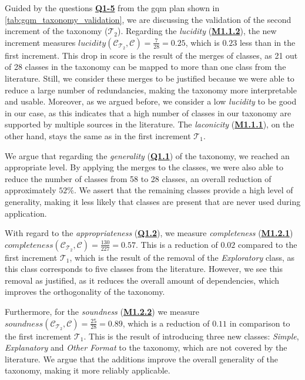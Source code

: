 \begin{sloppypar}
    Guided by the questions \hyperref[tab:gqm_taxonomy_validation]{\textbf{Q1-5}} from the \gls{gqm} plan shown in \autoref{tab:gqm_taxonomy_validation}, we are discussing the validation of the second increment of the taxonomy ($\mathcal{T}_2$). Regarding the \emph{lucidity} (\hyperref[tab:gqm_taxonomy_validation]{\textbf{M1.1.2}}), the new increment measures $lucidity(\mathcal{C}_{\mathcal{T}_2}, \mathcal{C}) = \frac{7}{28} = 0.25$, which is $0.23$ less than in the first increment. This drop in score is the result of the merges of classes, as 21 out of 28 classes in the taxonomy can be mapped to more than one class from the literature. Still, we consider these merges to be justified because we were able to reduce a large number of redundancies, making the taxonomy more interpretable and usable. Moreover, as we argued before, we consider a low \emph{lucidity} to be good in our case, as this indicates that a high number of classes in our taxonomy are supported by multiple sources in the literature. The \emph{laconicity} (\hyperref[tab:gqm_taxonomy_validation]{\textbf{M1.1.1}}), on the other hand, stays the same as in the first increment $\mathcal{T}_1$. 

    We argue that regarding the \emph{generality} (\hyperref[tab:gqm_taxonomy_validation]{\textbf{Q1.1}}) of the taxonomy, we reached an appropriate level. By applying the merges to the classes, we were also able to reduce the number of classes from 58 to 28 classes, an overall reduction of approximately $52\%$. We assert that the remaining classes provide a high level of generality, making it less likely that classes are present that are never used during application.
\end{sloppypar}

\begin{sloppypar}
    With regard to the \emph{appropriateness} (\hyperref[tab:gqm_taxonomy_validation]{\textbf{Q1.2}}), we measure \emph{completeness} (\hyperref[tab:gqm_taxonomy_validation]{\textbf{M1.2.1}}) $completeness(\mathcal{C}_{\mathcal{T}_2}, \mathcal{C}) = \frac{130}{227} = 0.57$. This is a reduction of $0.02$ compared to the first increment $\mathcal{T}_1$, which is the result of the removal of the \emph{Exploratory} class, as this class corresponds to five classes from the literature. However, we see this removal as justified, as it reduces the overall amount of dependencies, which improves the orthogonality of the taxonomy. 

    Furthermore, for the \emph{soundness} (\hyperref[tab:gqm_taxonomy_validation]{\textbf{M1.2.2}}) we measure $soundness(\mathcal{C}_{\mathcal{T}_2}, \mathcal{C}) = \frac{25}{28} = 0.89$, which is a reduction of $0.11$ in comparison to the first increment $\mathcal{T}_1$. This is the result of introducing three new classes: \emph{Simple}, \emph{Explanatory} and \emph{Other Format} to the taxonomy, which are not covered by the literature. We argue that the additions improve the overall generality of the taxonomy, making it more reliably applicable. 
\end{sloppypar}

